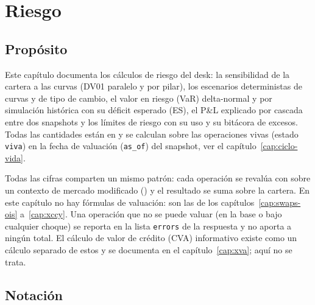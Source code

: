 \chapter{Riesgo}\label{cap:riesgo}

\section{Propósito}\label{sec:cap09-proposito}

Este capítulo documenta los cálculos de riesgo del desk: la sensibilidad de la cartera a las curvas (DV01
paralelo y por pilar), los escenarios deterministas de curvas y de tipo de cambio, el valor en riesgo (VaR)
delta-normal y por simulación histórica con su déficit esperado (ES), el P\&L explicado por cascada entre dos
snapshots y los límites de riesgo con su uso y su bitácora de excesos. Todas las cantidades están en \MXN{} y
se calculan sobre las operaciones vivas (estado \texttt{viva}) en la fecha de valuación (\texttt{as\_of}) del
snapshot, ver el capítulo~\ref{cap:ciclo-vida}.

Todas las cifras comparten un mismo patrón: cada operación se revalúa con 
sobre un contexto de mercado modificado () y el resultado se suma
sobre la cartera. En este capítulo no hay fórmulas de valuación: son las de los capítulos~\ref{cap:swaps-ois}
a~\ref{cap:xccy}. Una operación que no se puede valuar (en la base o bajo cualquier choque) se reporta en la lista
\texttt{errors} de la respuesta y no aporta a ningún total. El cálculo de valor de crédito (CVA) informativo existe
como un cálculo separado de estos y se documenta en el capítulo~\ref{cap:xva}; aquí no se trata.

\section{Notación}\label{sec:cap09-notacion}


